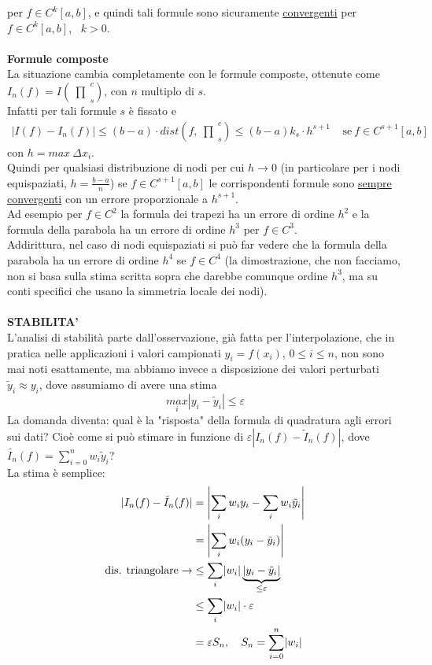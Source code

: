 \documentclass[12pt,a4paper]{article}
\DeclarePairedDelimiter{\abs}{\lvert}{\rvert}
\newcommand{\inter}{\begin{matrix}\prod\end{matrix}}
\begin{document}
per $f\in C^k[a,b]$, e quindi tali formule sono sicuramente \underline{convergenti} per $f\in C^k[a,b]$, \ $k>0$.\\\\
\textbf{Formule composte}\\
La situazione cambia completamente con le formule composte, ottenute come $I_n(f)=I(\inter_s^c)$, con $n$ multiplo di $s$.\\Infatti per tali formule $s$ è fissato e
\begin{equation*}
\begin{split}
    |I(f)-I_n(f)|\leq(b-a)\cdot dist(f,\inter_s^c)\leq(b-a)k_s\cdot h^{s+1} \  \  \  \  \  \text{se} \ f\in C^{s+1}[a,b]
\end{split}
\end{equation*}
con $h = max \ \Delta x_i$.\\
Quindi per qualsiasi distribuzione di nodi per cui $h\rightarrow0$ (in particolare per i nodi equispaziati, $h=\frac{b-a}{n}$) se $f\in C^{s+1}[a,b]$ le corrispondenti formule sono \underline{sempre convergenti} con un errore proporzionale a $h^{s+1}$.\\Ad esempio per $f\in C^2$ la formula dei trapezi ha un errore di ordine $h^2$ e la formula della parabola ha un errore di ordine $h^3$ per $f\in C^3$.\\
Addirittura, nel caso di nodi equispaziati si può far vedere che la formula della parabola ha un errore di ordine $h^4$ se $f\in C^4$ (la dimostrazione, che non facciamo, non si basa sulla stima scritta sopra che darebbe comunque ordine $h^3$, ma su conti specifici che usano la simmetria locale dei nodi).\\\\
\textbf{STABILITA'}\\
L'analisi di stabilità parte dall'osservazione, già fatta per l'interpolazione, che in pratica
nelle applicazioni i valori campionati $y_i=f(x_i)$, $0\leq i\leq n$, non sono mai noti esattamente, ma abbiamo invece a disposizione dei valori perturbati $\tilde{y}_i\approx y_i$, dove assumiamo di avere una stima 
\begin{equation*}
    \underset{i}{max}|y_i-\tilde{y}_i|\leq \varepsilon
\end{equation*}
La domanda diventa: qual è la "risposta" della formula di quadratura agli errori sui dati? Cioè come si può stimare in funzione di $\varepsilon|I_n(f)-\tilde{I}_n(f)|$, dove $\tilde{I_n}(f)=\sum_{i=0}^nw_i\tilde{y}_i$?\\
La stima è semplice:
\[\begin{split}
    \abs{I_n(f) - \Tilde{I}_n(f)} & = \abs*{\sum_i w_i y_i - \sum_i w_i \Tilde{y}_i} \\
    & = \abs*{\sum_i w_i( y_i - \Tilde{y}_i)} \\
    \text{dis. triangolare} \to & \le \sum_i \abs*{w_i} \underbrace{\abs*{y_i - \Tilde{y}_i}}_{\le \varepsilon} \\
    & \le \sum_i \abs*{w_i} \cdot \varepsilon \\
    & = \varepsilon S_n, \quad S_n = \sum_{i=0}^n \abs*{w_i}
\end{split}\]
\end{document}
